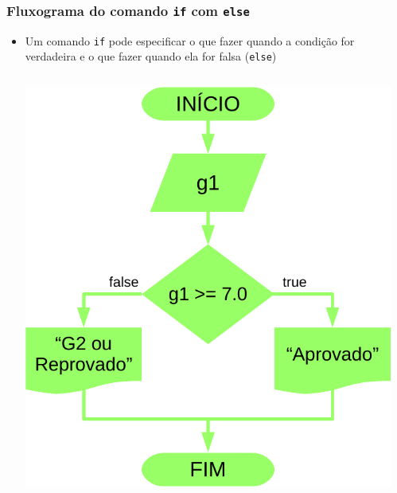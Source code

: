 \documentclass[xcolor={dvipsnames,table},aspectratio=169]{beamer}
\begin{document}
\begin{frame}[fragile]\frametitle{Fluxograma do comando \texttt{if} com \texttt{else}}
\begin{itemize}
	\item Um comando \texttt{if} pode especificar o que fazer quando a condição for verdadeira e o que fazer quando ela for falsa (\texttt{else})
\begin{columns}
\begin{column}{0.4\textwidth}
	\begin{center}
	\includegraphics[height=0.6\paperheight]{pucrs-ep-fprog-unidade_03-decisoes-laminas-fluxograma_if_else.png}
	\end{center}
\end{column}
\begin{column}{0.6\textwidth}
	\tiny{\inputminted[bgcolor=cyan!10]{java}{src/AprovadoOuNao.java}}
\end{column}
\end{columns}
\end{itemize}
\end{frame}
\end{document}
